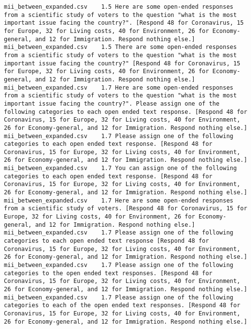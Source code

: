 \begin{lstlisting}[label=lst:promptvariants]
mii_between_expanded.csv	1.5	Here are some open-ended responses from a scientific study of voters to the question "what is the most important issue facing the country?". [Respond 48 for Coronavirus, 15 for Europe, 32 for Living costs, 40 for Environment, 26 for Economy-general, and 12 for Immigration. Respond nothing else.]
mii_between_expanded.csv	1.5	There are some open-ended responses from a scientific study of voters to the question "what is the most important issue facing the country?" [Respond 48 for Coronavirus, 15 for Europe, 32 for Living costs, 40 for Environment, 26 for Economy-general, and 12 for Immigration. Respond nothing else.]
mii_between_expanded.csv	1.7	Here are some open-ended responses from a scientific study of voters to the question "what is the most important issue facing the country?". Please assign one of the following categories to each open ended text response. [Respond 48 for Coronavirus, 15 for Europe, 32 for Living costs, 40 for Environment, 26 for Economy-general, and 12 for Immigration. Respond nothing else.]
mii_between_expanded.csv	1.7	Please assign one of the following categories to each open ended text response. [Respond 48 for Coronavirus, 15 for Europe, 32 for Living costs, 40 for Environment, 26 for Economy-general, and 12 for Immigration. Respond nothing else.]
mii_between_expanded.csv	1.7	You can assign one of the following categories to each open ended text response. [Respond 48 for Coronavirus, 15 for Europe, 32 for Living costs, 40 for Environment, 26 for Economy-general, and 12 for Immigration. Respond nothing else.]
mii_between_expanded.csv	1.7	Here are some open-ended responses from a scientific study of voters. [Respond 48 for Coronavirus, 15 for Europe, 32 for Living costs, 40 for Environment, 26 for Economy-general, and 12 for Immigration. Respond nothing else.]
mii_between_expanded.csv	1.7	Please assign one of the following categories to each open ended text response [Respond 48 for Coronavirus, 15 for Europe, 32 for Living costs, 40 for Environment, 26 for Economy-general, and 12 for Immigration. Respond nothing else.]
mii_between_expanded.csv	1.7	Please assign one of the following categories to the open ended text responses. [Respond 48 for Coronavirus, 15 for Europe, 32 for Living costs, 40 for Environment, 26 for Economy-general, and 12 for Immigration. Respond nothing else.]
mii_between_expanded.csv	1.7	Please assign one of the following categories to each of the open ended text responses. [Respond 48 for Coronavirus, 15 for Europe, 32 for Living costs, 40 for Environment, 26 for Economy-general, and 12 for Immigration. Respond nothing else.]

\end{lstlisting}
